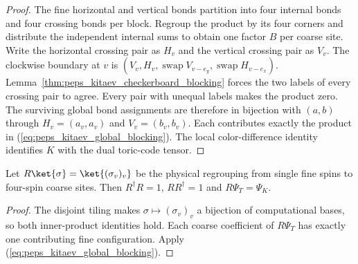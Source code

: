 \begin{proof}\leanok
    The fine horizontal and vertical bonds partition into four internal
    bonds and four crossing bonds per block. Regroup the product by its
    four corners and distribute the independent internal sums to obtain
    one factor $B$ per coarse site. Write the horizontal crossing pair
    as $H_v$ and the vertical crossing pair as $V_v$. The clockwise
    boundary at $v$ is
    $(V_v,H_v,\operatorname{swap}V_{v-e_y},
        \operatorname{swap}H_{v-e_x})$.
    Lemma~\ref{thm:peps_kitaev_checkerboard_blocking} forces the two
    labels of every crossing pair to agree. Every pair with unequal
    labels makes the product zero. The surviving global bond assignments
    are therefore in bijection with $(a,b)$ through
    $H_v=(a_v,a_v)$ and $V_v=(b_v,b_v)$.
    Each contributes exactly the product in
    (\ref{eq:peps_kitaev_global_blocking}). The local color-difference
    identity identifies $K$ with the dual toric-code tensor.
\end{proof}

\begin{lemma}%
    \label{thm:peps_kitaev_global_physical_blocking}
    \leanok
    Let $R\ket{\sigma}=\ket{(\sigma_v)_v}$ be the physical regrouping
    from single fine spins to four-spin coarse sites. Then
    $R^\dagger R=1$, $RR^\dagger=1$ and $R\Psi_T=\Psi_K$.
\end{lemma}

\begin{proof}\leanok
    The disjoint tiling makes $\sigma\mapsto(\sigma_v)_v$ a bijection
    of computational bases, so both inner-product identities hold.
    Each coarse coefficient of $R\Psi_T$ has exactly one contributing
    fine configuration. Apply (\ref{eq:peps_kitaev_global_blocking}).
\end{proof}
